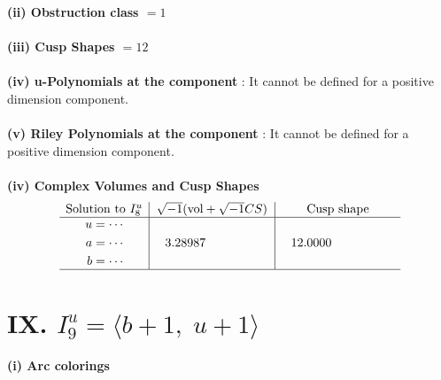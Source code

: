 \documentclass[1p]{elsarticle_modified}
\theoremstyle{definition}
\newcommand{\I}{\sqrt{-1}}
\begin{document}
\flushleft \textbf{(ii) Obstruction class $= 1$}\\~\\
\flushleft \textbf{(iii) Cusp Shapes $= 12$}\\~\\
\flushleft \textbf{(iv) u-Polynomials at the component} : It cannot be defined for a positive dimension component.\\~\\
\flushleft \textbf{(v) Riley Polynomials at the component} : It cannot be defined for a positive dimension component.\\~\\
\newpage\flushleft \textbf{(iv) Complex Volumes and Cusp Shapes}
$$\begin{array}{c|c|c} 
\text{Solution to }I^u_{8}& \I (\text{vol} + \sqrt{-1}CS) & \text{Cusp shape}\\
 \hline 
\begin{aligned}
u &= \cdots \\
a &= \cdots \\
b &= \cdots\end{aligned}
 & \phantom{-}3.28987\phantom{ +0.000000I} & \phantom{-}12.0000\phantom{ +0.000000I}\\
 \hline 
 \end{array}
$$\newpage\renewcommand{\arraystretch}{1}
\centering \section*{IX. $I^u_{9}= \langle b+1,\;u+1 \rangle$}
\flushleft \textbf{(i) Arc colorings}\\
\end{document}
